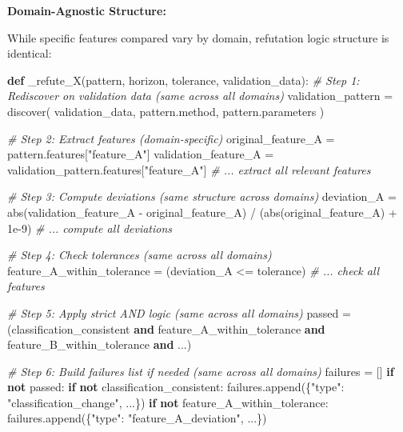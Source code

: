 \documentclass[
]{article}
\newenvironment{Shaded}{}{}
\newcommand{\BuiltInTok}[1]{\textcolor[rgb]{0.00,0.50,0.00}{#1}}
\newcommand{\CommentTok}[1]{\textcolor[rgb]{0.38,0.63,0.69}{\textit{#1}}}
\newcommand{\ControlFlowTok}[1]{\textcolor[rgb]{0.00,0.44,0.13}{\textbf{#1}}}
\newcommand{\FloatTok}[1]{\textcolor[rgb]{0.25,0.63,0.44}{#1}}
\newcommand{\KeywordTok}[1]{\textcolor[rgb]{0.00,0.44,0.13}{\textbf{#1}}}
\newcommand{\NormalTok}[1]{#1}
\newcommand{\OperatorTok}[1]{\textcolor[rgb]{0.40,0.40,0.40}{#1}}
\newcommand{\StringTok}[1]{\textcolor[rgb]{0.25,0.44,0.63}{#1}}
\begin{document}
\textbf{Domain-Agnostic Structure:}

While specific features compared vary by domain, refutation logic
structure is identical:

\begin{Shaded}
\begin{Highlighting}[]
\KeywordTok{def}\NormalTok{ \_refute\_X(pattern, horizon, tolerance, validation\_data):}
    \CommentTok{\# Step 1: Rediscover on validation data (same across all domains)}
\NormalTok{    validation\_pattern }\OperatorTok{=}\NormalTok{ discover(}
\NormalTok{        validation\_data,}
\NormalTok{        pattern.method,}
\NormalTok{        pattern.parameters}
\NormalTok{    )}

    \CommentTok{\# Step 2: Extract features (domain{-}specific)}
\NormalTok{    original\_feature\_A }\OperatorTok{=}\NormalTok{ pattern.features[}\StringTok{"feature\_A"}\NormalTok{]}
\NormalTok{    validation\_feature\_A }\OperatorTok{=}\NormalTok{ validation\_pattern.features[}\StringTok{"feature\_A"}\NormalTok{]}
    \CommentTok{\# ... extract all relevant features}

    \CommentTok{\# Step 3: Compute deviations (same structure across domains)}
\NormalTok{    deviation\_A }\OperatorTok{=} \BuiltInTok{abs}\NormalTok{(validation\_feature\_A }\OperatorTok{{-}}\NormalTok{ original\_feature\_A) }\OperatorTok{/}\NormalTok{ (}\BuiltInTok{abs}\NormalTok{(original\_feature\_A) }\OperatorTok{+} \FloatTok{1e{-}9}\NormalTok{)}
    \CommentTok{\# ... compute all deviations}

    \CommentTok{\# Step 4: Check tolerances (same across all domains)}
\NormalTok{    feature\_A\_within\_tolerance }\OperatorTok{=}\NormalTok{ (deviation\_A }\OperatorTok{\textless{}=}\NormalTok{ tolerance)}
    \CommentTok{\# ... check all features}

    \CommentTok{\# Step 5: Apply strict AND logic (same across all domains)}
\NormalTok{    passed }\OperatorTok{=}\NormalTok{ (classification\_consistent }\KeywordTok{and}
\NormalTok{              feature\_A\_within\_tolerance }\KeywordTok{and}
\NormalTok{              feature\_B\_within\_tolerance }\KeywordTok{and}\NormalTok{ ...)}

    \CommentTok{\# Step 6: Build failures list if needed (same across all domains)}
\NormalTok{    failures }\OperatorTok{=}\NormalTok{ []}
    \ControlFlowTok{if} \KeywordTok{not}\NormalTok{ passed:}
        \ControlFlowTok{if} \KeywordTok{not}\NormalTok{ classification\_consistent:}
\NormalTok{            failures.append(\{}\StringTok{"type"}\NormalTok{: }\StringTok{"classification\_change"}\NormalTok{, ...\})}
        \ControlFlowTok{if} \KeywordTok{not}\NormalTok{ feature\_A\_within\_tolerance:}
\NormalTok{            failures.append(\{}\StringTok{"type"}\NormalTok{: }\StringTok{"feature\_A\_deviation"}\NormalTok{, ...\})}


\end{Highlighting}
\end{Shaded}
\end{document}
